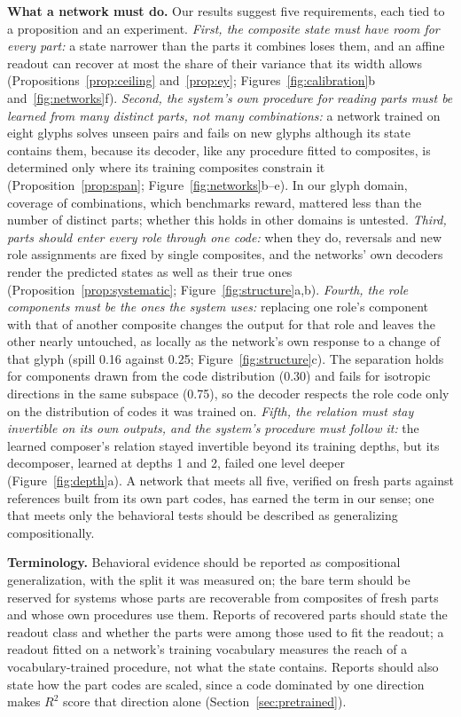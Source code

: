 \documentclass[10pt]{article}
\theoremstyle{plain}
\theoremstyle{remark}
\begin{document}
\textbf{What a network must do.} Our results suggest five requirements, each tied to a proposition and an experiment. \emph{First, the composite state must have room for every part:} a state narrower than the parts it combines loses them, and an affine readout can recover at most the share of their variance that its width allows (Propositions~\ref{prop:ceiling} and~\ref{prop:ey}; Figures~\ref{fig:calibration}b and~\ref{fig:networks}f). \emph{Second, the system's own procedure for reading parts must be learned from many distinct parts, not many combinations:} a network trained on eight glyphs solves unseen pairs and fails on new glyphs although its state contains them, because its decoder, like any procedure fitted to composites, is determined only where its training composites constrain it (Proposition~\ref{prop:span}; Figure~\ref{fig:networks}b--e). In our glyph domain, coverage of combinations, which benchmarks reward, mattered less than the number of distinct parts; whether this holds in other domains is untested. \emph{Third, parts should enter every role through one code:} when they do, reversals and new role assignments are fixed by single composites, and the networks' own decoders render the predicted states as well as their true ones (Proposition~\ref{prop:systematic}; Figure~\ref{fig:structure}a,b). \emph{Fourth, the role components must be the ones the system uses:} replacing one role's component with that of another composite changes the output for that role and leaves the other nearly untouched, as locally as the network's own response to a change of that glyph (spill 0.16 against 0.25; Figure~\ref{fig:structure}c). The separation holds for components drawn from the code distribution (0.30) and fails for isotropic directions in the same subspace (0.75), so the decoder respects the role code only on the distribution of codes it was trained on. \emph{Fifth, the relation must stay invertible on its own outputs, and the system's procedure must follow it:} the learned composer's relation stayed invertible beyond its training depths, but its decomposer, learned at depths 1 and 2, failed one level deeper (Figure~\ref{fig:depth}a). A network that meets all five, verified on fresh parts against references built from its own part codes, has earned the term in our sense; one that meets only the behavioral tests should be described as generalizing compositionally.

\textbf{Terminology.} Behavioral evidence should be reported as compositional generalization, with the split it was measured on; the bare term should be reserved for systems whose parts are recoverable from composites of fresh parts and whose own procedures use them. Reports of recovered parts should state the readout class and whether the parts were among those used to fit the readout; a readout fitted on a network's training vocabulary measures the reach of a vocabulary-trained procedure, not what the state contains. Reports should also state how the part codes are scaled, since a code dominated by one direction makes $R^2$ score that direction alone (Section~\ref{sec:pretrained}).
\end{document}
